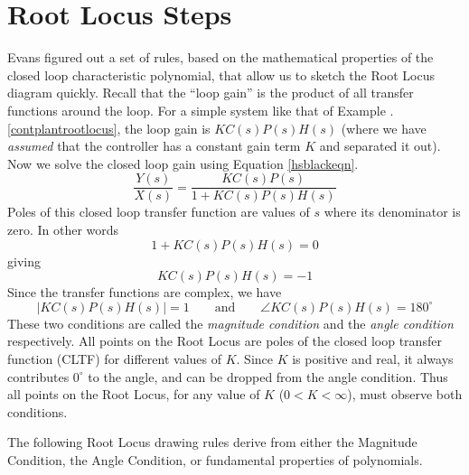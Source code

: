 






\section{Root Locus Steps}

Evans figured out a set of rules, based on the mathematical properties of the closed loop characteristic polynomial, that allow us to sketch the Root Locus diagram quickly.
Recall that the ``loop gain'' is the product of all transfer functions around the loop.  For a simple system like that of Example \thechapter.\ref{contplantrootlocus}, the loop gain is $KC(s)P(s)H(s)$ (where we have {\it assumed} that the controller has a constant gain term $K$ and separated it out).  Now we solve the closed loop gain using Equation \ref{hsblackeqn}.
\[
\frac{Y(s)}{X(s)} = \frac  {KC(s)P(s)}   {1+KC(s)P(s)H(s)}
\]
Poles of this closed loop transfer function are values of $s$ where its denominator is zero.  In other words
\[
 {1+KC(s)P(s)H(s)} = 0
\]
giving
\[
{KC(s)P(s)H(s)} = -1
\]
Since the transfer functions are complex, we have
\[
\left | KC(s)P(s)H(s)\right | = 1 \qquad \mathrm{and} \qquad \angle KC(s)P(s)H(s) = 180^\circ
\]
These two conditions are called the {\it magnitude condition} and the {\it angle condition} respectively.
All points on the Root Locus are poles of the closed loop transfer function (CLTF) for different values of $K$.  Since $K$ is positive and real, it always contributes $0^\circ$ to the angle, and can be dropped from the angle condition.  Thus all points on the Root Locus, for any value of $K$ ($0<K<\infty$), must observe both conditions.

The following Root Locus drawing rules derive from either the Magnitude Condition, the Angle Condition, or fundamental properties of polynomials.



